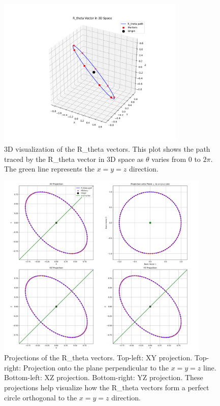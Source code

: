 \documentclass[12pt,a4paper]{article}
\begin{document}
\begin{figure}[H]
    \centering
    \includegraphics[width=0.8\textwidth]{improved_berry_phase_results/r_theta_3d.png}
    \caption{3D visualization of the R\_theta vectors. This plot shows the path traced by the R\_theta vector in 3D space as $\theta$ varies from 0 to $2\pi$. The green line represents the $x=y=z$ direction.}
    \label{fig:r_theta_3d}
\end{figure}

\begin{figure}[H]
    \centering
    \includegraphics[width=0.9\textwidth]{improved_berry_phase_results/r_theta_3d_with_projections.png}
    \caption{Projections of the R\_theta vectors. Top-left: XY projection. Top-right: Projection onto the plane perpendicular to the $x=y=z$ line. Bottom-left: XZ projection. Bottom-right: YZ projection. These projections help visualize how the R\_theta vectors form a perfect circle orthogonal to the $x=y=z$ direction.}
    \label{fig:r_theta_projections}
\end{figure}
\end{document}
